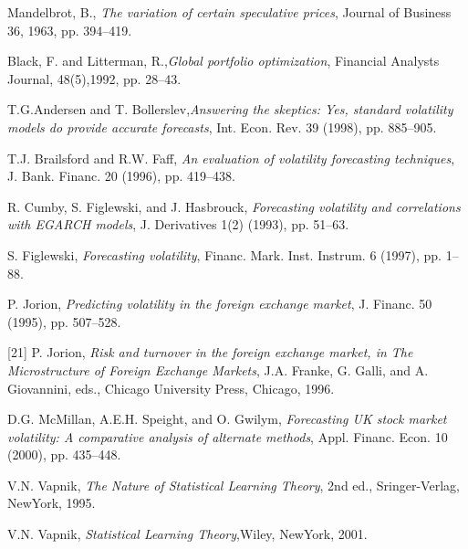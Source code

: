 \begin{thebibliography}{9}
Mandelbrot, B., \textit{The variation of certain speculative prices}, Journal of Business 36, 1963, pp. 394–419.

Black, F. and Litterman, R.,\textit{Global portfolio optimization}, Financial Analysts Journal, 48(5),1992, pp. 28–43.

T.G.Andersen and T. Bollerslev,\textit{Answering the skeptics: Yes, standard volatility models do provide accurate forecasts}, Int. Econ. Rev. 39 (1998), pp. 885–905.

T.J. Brailsford and R.W. Faff, \textit{An evaluation of volatility forecasting techniques}, J. Bank. Financ. 20 (1996), pp. 419–438.

R. Cumby, S. Figlewski, and J. Hasbrouck, \textit{Forecasting volatility and correlations with EGARCH models}, J. Derivatives 1(2) (1993), pp. 51–63.

S. Figlewski, \textit{Forecasting volatility}, Financ. Mark. Inst. Instrum. 6 (1997), pp. 1–88.

P. Jorion, \textit{Predicting volatility in the foreign exchange market}, J. Financ. 50 (1995), pp. 507–528.

[21] P. Jorion, \textit{Risk and turnover in the foreign exchange market, in The Microstructure of Foreign Exchange Markets}, J.A. Franke, G. Galli, and A. Giovannini, eds., Chicago University Press, Chicago, 1996.

D.G. McMillan, A.E.H. Speight, and O. Gwilym, \textit{Forecasting UK stock market volatility: A comparative analysis of alternate methods}, Appl. Financ. Econ. 10 (2000), pp. 435–448.

V.N. Vapnik, \textit{The Nature of Statistical Learning Theory}, 2nd ed., Sringer-Verlag, NewYork, 1995.


V.N. Vapnik, \textit{Statistical Learning Theory},Wiley, NewYork, 2001.

\end{thebibliography}